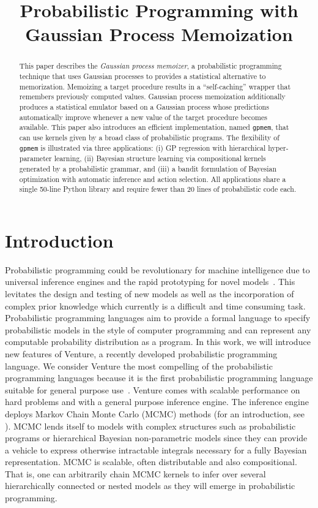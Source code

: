 \documentclass{article} %
\title{Probabilistic Programming with Gaussian Process Memoization}
\author{
}
\begin{document}
\maketitle

\begin{abstract}
This paper describes the {\em Gaussian process memoizer}, a probabilistic programming technique that uses Gaussian processes to provides a statistical alternative to memorization. Memoizing a target procedure results in a “self-caching” wrapper that remembers previously computed values. Gaussian process memoization additionally produces a statistical emulator based on a Gaussian process whose predictions automatically improve whenever a new value of the target procedure becomes available. This paper also introduces  an efficient implementation, named {\tt gpmem}, that can use kernels given by a broad class of probabilistic programs. The flexibility of {\tt gpmem} is illustrated via three applications: (i) GP regression with hierarchical hyper-parameter learning, (ii) Bayesian structure learning via compositional kernels generated by a probabilistic grammar, and (iii) a bandit formulation of Bayesian optimization with automatic inference and action selection. All applications share a single 50-line Python library and require fewer than 20 lines of probabilistic code each.
\end{abstract}

\section{Introduction}
Probabilistic programming could be revolutionary for machine intelligence due to universal inference engines and the rapid prototyping for novel models~\citep{ghahramani2015probabilistic}. This levitates the design and testing of new models as well as the incorporation of complex prior knowledge which currently is a difficult and time consuming task. Probabilistic programming languages aim to provide a formal language to specify probabilistic models in the style of computer programming and can represent any computable probability distribution as a program. In this work, we will introduce new features of Venture, a recently developed probabilistic programming language. We consider Venture the most compelling of the probabilistic programming languages because it is the first probabilistic programming language suitable for general purpose use~\citep{mansinghka2014venture}. Venture comes with scalable performance on hard problems and with a general purpose inference engine. The inference engine deploys Markov Chain Monte Carlo (MCMC) methods (for an introduction, see \citet*{andrieu2003introduction}). MCMC lends itself to models with complex structures such as probabilistic programs or hierarchical Bayesian non-parametric models since they can provide a vehicle to express otherwise intractable integrals necessary for a fully Bayesian representation. MCMC is scalable, often distributable and also compositional. That is, one can arbitrarily chain MCMC kernels to infer over several hierarchically connected or nested models as they will emerge in probabilistic programming.
\end{document}
